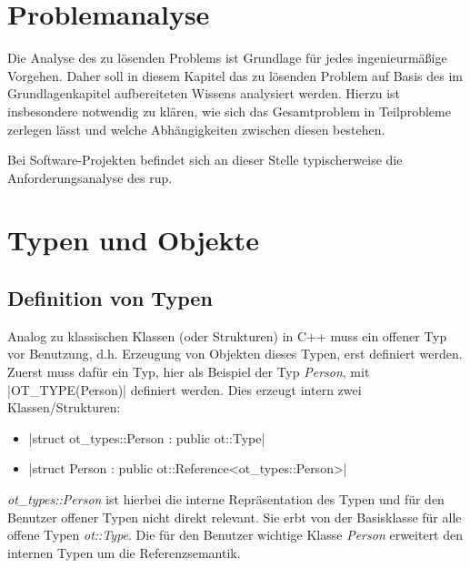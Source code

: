 \documentclass[oneside]{ausarbeitung}
\begin{document}
\chapter{Problemanalyse}
\label{cha:problemanalyse}

Die Analyse des zu lösenden Problems ist Grundlage für jedes 
ingenieurmäßige Vorgehen. Daher soll in diesem Kapitel das zu lösenden 
Problem auf Basis des im Grundlagenkapitel aufbereiteten Wissens 
analysiert werden. Hierzu ist insbesondere notwendig zu klären, wie sich 
das Gesamtproblem in Teilprobleme zerlegen lässt und welche 
Abhängigkeiten zwischen diesen bestehen.

Bei Software-Projekten befindet sich an dieser Stelle typischerweise die 
Anforderungsanalyse des \ac{rup}.

\chapter{Typen und Objekte}
\label{cha:types_and_objects}

\section{Definition von Typen}
\label{sec:types}
Analog zu klassischen Klassen (oder Strukturen) in C++ muss ein offener Typ vor Benutzung, d.h. Erzeugung von Objekten dieses Typen, erst definiert werden. 
Zuerst muss dafür ein Typ, hier als Beispiel der Typ \textit{Person}, mit
|OT_TYPE(Person)|
definiert werden.
Dies erzeugt intern zwei Klassen/Strukturen:
\begin{itemize}
\item {}|struct ot_types::Person : public ot::Type|
\item {}|struct Person : public ot::Reference<ot_types::Person>|
\end{itemize}
\textit{ot{\_}types::Person} ist hierbei die interne Repräsentation des Typen und für den Benutzer offener Typen nicht direkt relevant. Sie erbt von
der Basisklasse für alle offene Typen \textit{ot::Type}.
Die für den Benutzer wichtige Klasse \textit{Person} erweitert den internen Typen um die Referenzsemantik.
\end{document}
